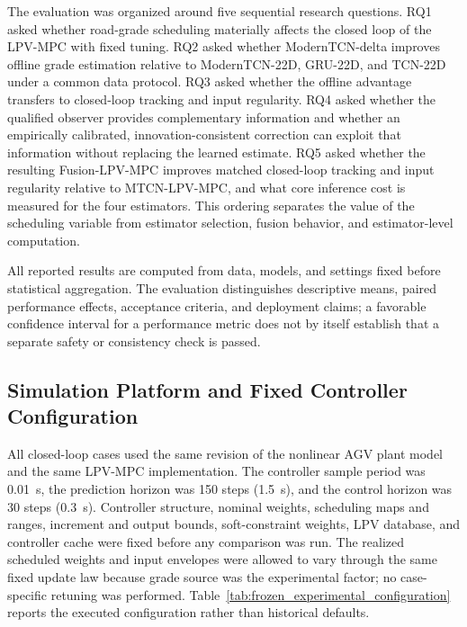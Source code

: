 \documentclass{ieeeaccess}
\begin{document}
The evaluation was organized around five sequential research questions. RQ1 asked whether road-grade scheduling materially affects the closed loop of the LPV-MPC with fixed tuning. RQ2 asked whether ModernTCN-delta improves offline grade estimation relative to ModernTCN-22D, GRU-22D, and TCN-22D under a common data protocol. RQ3 asked whether the offline advantage transfers to closed-loop tracking and input regularity. RQ4 asked whether the qualified observer provides complementary information and whether an empirically calibrated, innovation-consistent correction can exploit that information without replacing the learned estimate. RQ5 asked whether the resulting Fusion-LPV-MPC improves matched closed-loop tracking and input regularity relative to MTCN-LPV-MPC, and what core inference cost is measured for the four estimators. This ordering separates the value of the scheduling variable from estimator selection, fusion behavior, and estimator-level computation.

All reported results are computed from data, models, and settings fixed before statistical aggregation. The evaluation distinguishes descriptive means, paired performance effects, acceptance criteria, and deployment claims; a favorable confidence interval for a performance metric does not by itself establish that a separate safety or consistency check is passed.

\subsection{Simulation Platform and Fixed Controller Configuration}

All closed-loop cases used the same revision of the nonlinear AGV plant model and the same LPV-MPC implementation. The controller sample period was 0.01~s, the prediction horizon was 150 steps (1.5~s), and the control horizon was 30 steps (0.3~s). Controller structure, nominal weights, scheduling maps and ranges, increment and output bounds, soft-constraint weights, LPV database, and controller cache were fixed before any comparison was run. The realized scheduled weights and input envelopes were allowed to vary through the same fixed update law because grade source was the experimental factor; no case-specific retuning was performed. Table~\ref{tab:frozen_experimental_configuration} reports the executed configuration rather than historical defaults.
\end{document}
